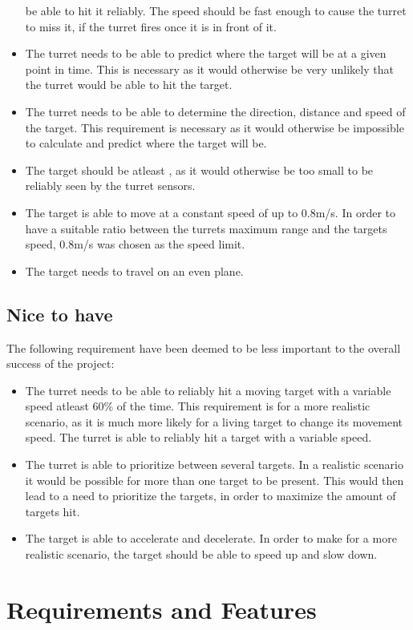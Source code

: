 \begin{itemize}
  be able to hit it reliably. The speed should be fast enough to cause the
  turret to miss it, if the turret fires once it is in front of it.
  \item The turret needs to be able to predict where the target will be at a given point
in time. This is necessary as it would otherwise be very unlikely that the
turret would be able to hit the target.
  \item The turret needs to be able to determine the direction, distance
  and speed of the target. This requirement is necessary as it would otherwise be impossible to
calculate and predict where the target will be.
  \item The target should be atleast , as it
would otherwise be too small to be reliably seen by the turret sensors.
  \item The target is able to move at a constant speed of up to 0.8m/s. In order to
have a suitable ratio between the turrets maximum range and the targets
speed, 0.8m/s was chosen as the speed limit.
  \item The target needs to travel on an even plane.
\end{itemize}

\subsection{Nice to have}
The following requirement have been deemed to be less important to the overall
success of the project:
\begin{itemize}
  \item The turret needs to be able to reliably hit a moving target with a
variable speed atleast 60\% of the time. This requirement is for a
more realistic scenario, as it is much more likely for a living target to
change its movement speed. The turret is able to reliably hit a target with a
variable speed.
  \item The turret is able to prioritize between several targets. In a realistic
scenario it would be possible for more than one target to be present. This would
then lead to a need to prioritize the targets, in order to maximize the
amount of targets hit.
  \item The target is able to accelerate and decelerate. In order to make for a
  more realistic scenario, the target should be able to speed up and slow down.
\end{itemize}

\section{Requirements and Features}

